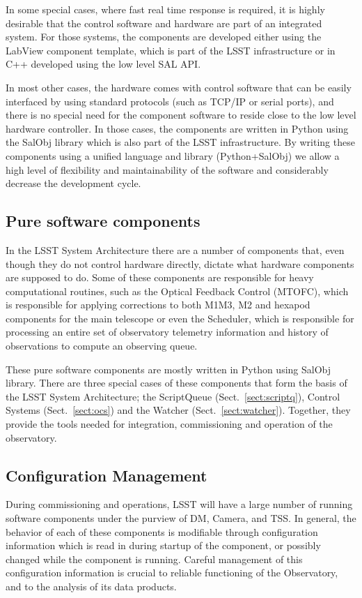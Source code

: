 In some special cases, where fast real time response is required, it is highly desirable that the control software and hardware are part 
of an integrated system. For those systems, the components are developed either using the LabView component template, which is 
part of the LSST infrastructure or in C++ developed using the low level SAL API.

In most other cases, the hardware comes with control software that can be easily interfaced by using standard protocols (such as 
TCP/IP or serial ports), and there is no special need for the component software to reside close to the low level hardware controller. 
In those cases, the components are written in Python using the SalObj library which is also part of the LSST infrastructure. By 
writing these components using a unified language and library (Python+SalObj) we allow a high level of flexibility and 
maintainability of the software and considerably decrease the development cycle.

\subsection{Pure software components}\label{sect:software_csc}
In the LSST System Architecture there are a number of components that, even though they do not control hardware directly, dictate 
what hardware components are supposed to do. Some of these components are responsible for heavy computational routines, 
such as the Optical Feedback Control (MTOFC), which is responsible for applying corrections to both M1M3, M2 and 
hexapod components for the main telescope or even the Scheduler, which is responsible for processing an entire set of 
observatory telemetry information and history of observations to compute an observing queue.

These pure software components are mostly written in Python using SalObj library. There are three special cases of these 
components that form the basis of the LSST System Architecture; the ScriptQueue (Sect.~\ref{sect:scriptq}), Control 
Systems (Sect.~\ref{sect:ocs}) and the Watcher (Sect.~\ref{sect:watcher}). Together, they provide the tools needed for 
integration, commissioning and operation of the observatory.

\subsection{Configuration Management}\label{sect:config}
During commissioning and operations, LSST will have a large number of running software components under the purview of DM, 
Camera, and TSS. In general, the behavior of each of these components is modifiable through configuration information which 
is read in during startup of the component, or possibly changed while the component is running. Careful management of 
this configuration information is crucial to reliable functioning of the Observatory, and to the analysis of its data products.

